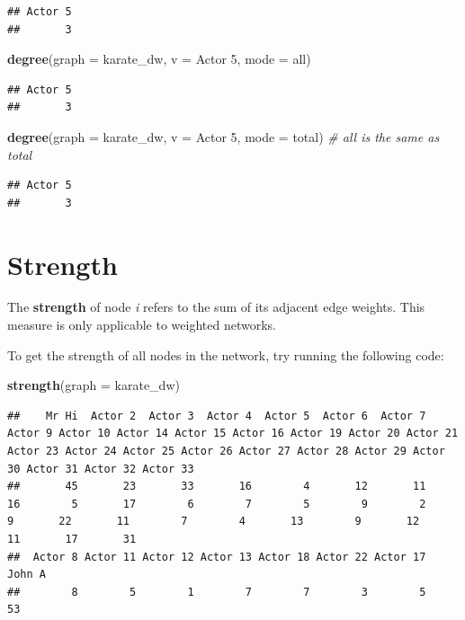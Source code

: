 \documentclass[
]{book}
\newenvironment{Shaded}{\begin{snugshade}}{\end{snugshade}}
\newcommand{\AttributeTok}[1]{\textcolor[rgb]{0.13,0.29,0.53}{#1}}
\newcommand{\CommentTok}[1]{\textcolor[rgb]{0.56,0.35,0.01}{\textit{#1}}}
\newcommand{\FunctionTok}[1]{\textcolor[rgb]{0.13,0.29,0.53}{\textbf{#1}}}
\newcommand{\NormalTok}[1]{#1}
\newcommand{\StringTok}[1]{\textcolor[rgb]{0.31,0.60,0.02}{#1}}
\begin{document}
\begin{verbatim}
## Actor 5 
##       3
\end{verbatim}

\begin{Shaded}
\begin{Highlighting}[]
\FunctionTok{degree}\NormalTok{(}\AttributeTok{graph =}\NormalTok{ karate\_dw, }\AttributeTok{v =} \StringTok{\textquotesingle{}Actor 5\textquotesingle{}}\NormalTok{, }\AttributeTok{mode =} \StringTok{\textquotesingle{}all\textquotesingle{}}\NormalTok{) }
\end{Highlighting}
\end{Shaded}

\begin{verbatim}
## Actor 5 
##       3
\end{verbatim}

\begin{Shaded}
\begin{Highlighting}[]
\FunctionTok{degree}\NormalTok{(}\AttributeTok{graph =}\NormalTok{ karate\_dw, }\AttributeTok{v =} \StringTok{\textquotesingle{}Actor 5\textquotesingle{}}\NormalTok{, }\AttributeTok{mode =} \StringTok{\textquotesingle{}total\textquotesingle{}}\NormalTok{) }\CommentTok{\# all is the same as total}
\end{Highlighting}
\end{Shaded}

\begin{verbatim}
## Actor 5 
##       3
\end{verbatim}

\section{Strength}\label{strength}

The \textbf{strength} of node \emph{i} refers to the sum of its adjacent edge weights. This measure is only applicable to weighted networks.

To get the strength of all nodes in the network, try running the following code:

\begin{Shaded}
\begin{Highlighting}[]
\FunctionTok{strength}\NormalTok{(}\AttributeTok{graph =}\NormalTok{ karate\_dw)}
\end{Highlighting}
\end{Shaded}

\begin{verbatim}
##    Mr Hi  Actor 2  Actor 3  Actor 4  Actor 5  Actor 6  Actor 7  Actor 9 Actor 10 Actor 14 Actor 15 Actor 16 Actor 19 Actor 20 Actor 21 Actor 23 Actor 24 Actor 25 Actor 26 Actor 27 Actor 28 Actor 29 Actor 30 Actor 31 Actor 32 Actor 33 
##       45       23       33       16        4       12       11       16        5       17        6        7        5        9        2        9       22       11        7        4       13        9       12       11       17       31 
##  Actor 8 Actor 11 Actor 12 Actor 13 Actor 18 Actor 22 Actor 17   John A 
##        8        5        1        7        7        3        5       53
\end{verbatim}
\end{document}
